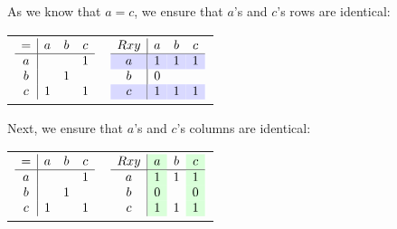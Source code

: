 \documentclass[PHIL101-Textbook.tex]{subfiles}
\begin{document}
\noindent As we know that $a=c$, we ensure that $a$'s and $c$'s rows are identical:

\begin{center}
  \begin{tabular}{ll}
	$\begin{array}{c|ccc}
	   = & a & b & c\\ \hline
	   a &   &   &1\\
	   b &   &1&\\
	   c &1&   &1
	 \end{array}$
		 & 
	$\begin{array}{c|ccc}
	   \atom R {xy} & a & b & c\\ \hline
	   \cellcolor{blue!15} a & \cellcolor{blue!15}\vT& \cellcolor{blue!15}\vT&\cellcolor{blue!15} \vT \\
	   b & \vF& \\
	   \cellcolor{blue!15} c & \cellcolor{blue!15}\vT& \cellcolor{blue!15}\vT&\cellcolor{blue!15} \vT
	 \end{array}$
  \end{tabular}
\end{center}

\noindent Next, we ensure that $a$'s and $c$'s columns are identical:

\begin{center}
  \begin{tabular}{ll}
	$\begin{array}{c|ccc}
	   = & a & b & c\\ \hline
	   a &   &   &1\\
	   b &   &1&\\
	   c &1&   &1
	 \end{array}$
		 & 
	$\begin{array}{c|ccc}
	   \atom R {xy} & \cellcolor{green!15} a  & b & \cellcolor{green!15} c\\ \hline
	   a & \cellcolor{green!15}\vT & \vT  &\cellcolor{green!15} \vT \\
	   b & \cellcolor{green!15}\vF & & \cellcolor{green!15}\vF\\
	   c & \cellcolor{green!15}\vT & \vT  &\cellcolor{green!15} \vT
	 \end{array}$
  \end{tabular}
\end{center} 
\end{document}
